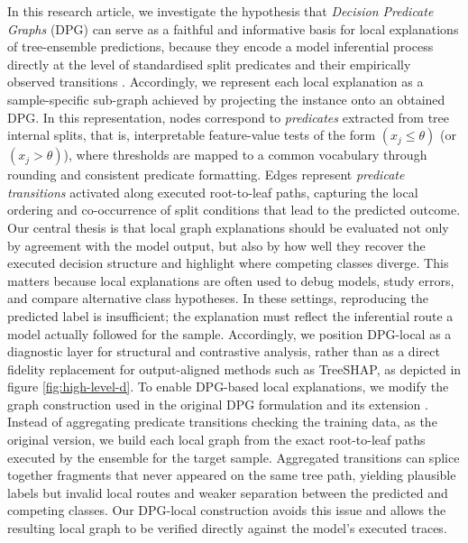 \documentclass[runningheads]{llncs}
\begin{document}
In this research article, we investigate the hypothesis that \emph{Decision Predicate Graphs} (DPG) can serve as a faithful and informative basis for local explanations of tree-ensemble predictions, because they encode a model inferential process directly at the level of standardised split predicates and their empirically observed transitions \cite{arrighi2024decision}. 
Accordingly, we represent each local explanation as a sample-specific sub-graph achieved by projecting the instance onto an obtained DPG. In this representation, nodes correspond to \emph{predicates} extracted from tree internal splits, that is, interpretable feature-value tests of the form $(x_j \leq \theta)$ (or $(x_j > \theta)$), where thresholds are mapped to a common vocabulary through rounding and consistent predicate formatting. 
Edges represent \emph{predicate transitions} activated along executed root-to-leaf paths, capturing the local ordering and co-occurrence of split conditions that lead to the predicted outcome.
Our central thesis is that local graph explanations should be evaluated not only by agreement with the model output, but also by how well they recover the executed decision structure and highlight where competing classes diverge. This matters because local explanations are often used to debug models, study errors, and compare alternative class hypotheses. In these settings, reproducing the predicted label is insufficient; the explanation must reflect the inferential route a model actually followed for the sample. Accordingly, we position DPG-local as a diagnostic layer for structural and contrastive analysis, rather than as a direct fidelity replacement for output-aligned methods such as TreeSHAP, as depicted in figure \ref{fig:high-level-d}. %
To enable DPG-based local explanations, we modify the graph construction used in the original DPG formulation and its extension \cite{arrighi2024decision,ceschin2025extending}. Instead of aggregating predicate transitions checking the training data, as the original version, we build each local graph from the exact root-to-leaf paths executed by the ensemble for the target sample. Aggregated transitions can splice together fragments that never appeared on the same tree path, yielding plausible labels but invalid local routes and weaker separation between the predicted and competing classes. Our DPG-local construction avoids this issue and allows the resulting local graph to be verified directly against the model's executed traces.
\end{document}
